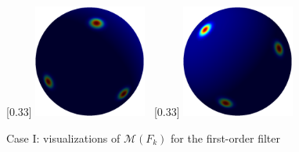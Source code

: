 \begin{frame}
{\begin{figure}
    [0.33\textwidth]{
        \includegraphics[width=0.33\textwidth,height=0.35\textheight,keepaspectratio]{figures/2017AAS_matrix_fisher/TAC16_0_F_51b}}~
    [0.33\textwidth]{
        \includegraphics[width=0.33\textwidth,height=0.35\textheight,keepaspectratio]{figures/2017AAS_matrix_fisher/TAC16_0_F_501b}}
    \caption{Case I: visualizations of $\mathcal{M}(F_k)$ for the first-order filter}\label{fig:visES_0}
\end{figure}
}

\end{frame}

